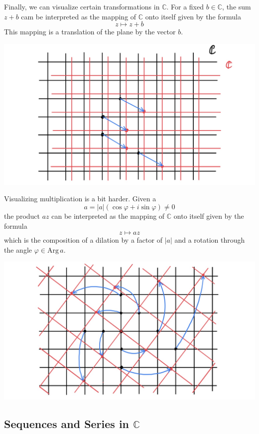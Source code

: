   Finally, we can visualize certain transformations in $\mathbb{C}$. For a fixed $b \in \mathbb{C}$, the sum $z + b$ cam be interpreted as the mapping of $\mathbb{C}$ onto itself given by the formula 
  \[z \mapsto z + b\]
  This mapping is a translation of the plane by the vector $b$. 
  \begin{center}
      \includegraphics[scale=0.25]{img/Translation_in_Complex_Plane.jpg}
  \end{center}
  Visualizing multiplication is a bit harder. Given a 
  \[a = |a| (\cos{\varphi} + i \sin{\varphi}) \neq 0\]
  the product $az$ can be interpreted as the mapping of $\mathbb{C}$ onto itself given by the formula
  \[z \mapsto az\]
  which is the composition of a dilation by a factor of $|a|$ and a rotation through the angle $\varphi \in \text{Arg}\,a$. 
  \begin{center}
      \includegraphics[scale=0.3]{img/Multiplication_in_Complex_Plane.jpg}
  \end{center}

  \subsection[Sequences and Series in C]{Sequences and Series in $\mathbb{C}$}

